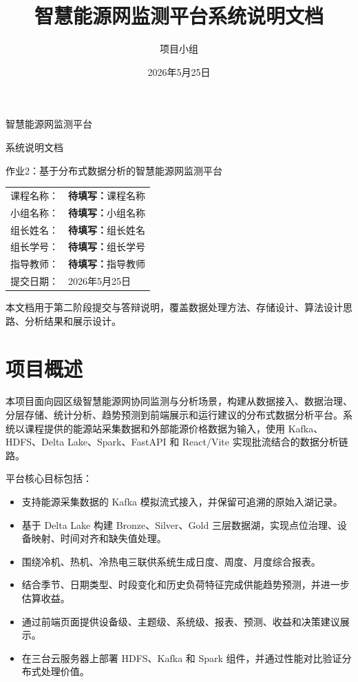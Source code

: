 \documentclass[UTF8,11pt,a4paper]{ctexart}
\title{智慧能源网监测平台系统说明文档}
\author{项目小组}
\date{2026年5月25日}
\newcommand{\todo}[1]{\textbf{待填写：}#1}
\begin{document}
\begin{titlepage}
  \centering
  \vspace*{2.2cm}
  {\heiti 智慧能源网监测平台\par}
  \vspace{0.6cm}
  {\heiti 系统说明文档\par}
  \vspace{1.4cm}
  {作业2：基于分布式数据分析的智慧能源网监测平台\par}
  \vspace{2.0cm}
  \begin{tabular}{rl}
    课程名称： & \todo{课程名称}\\[0.35cm]
    小组名称： & \todo{小组名称}\\[0.35cm]
    组长姓名： & \todo{组长姓名}\\[0.35cm]
    组长学号： & \todo{组长学号}\\[0.35cm]
    指导教师： & \todo{指导教师}\\[0.35cm]
    提交日期： & 2026年5月25日
  \end{tabular}
  \vfill
  {\small 本文档用于第二阶段提交与答辩说明，覆盖数据处理方法、存储设计、算法设计思路、分析结果和展示设计。}
\end{titlepage}

\tableofcontents
\newpage

\section{项目概述}

本项目面向园区级智慧能源网协同监测与分析场景，构建从数据接入、数据治理、分层存储、统计分析、趋势预测到前端展示和运行建议的分布式数据分析平台。系统以课程提供的能源站采集数据和外部能源价格数据为输入，使用 Kafka、HDFS、Delta Lake、Spark、FastAPI 和 React/Vite 实现批流结合的数据分析链路。

平台核心目标包括：

\begin{itemize}
  \item 支持能源采集数据的 Kafka 模拟流式接入，并保留可追溯的原始入湖记录。
  \item 基于 Delta Lake 构建 Bronze、Silver、Gold 三层数据湖，实现点位治理、设备映射、时间对齐和缺失值处理。
  \item 围绕冷机、热机、冷热电三联供系统生成日度、周度、月度综合报表。
  \item 结合季节、日期类型、时段变化和历史负荷特征完成供能趋势预测，并进一步估算收益。
  \item 通过前端页面提供设备级、主题级、系统级、报表、预测、收益和决策建议展示。
  \item 在三台云服务器上部署 HDFS、Kafka 和 Spark 组件，并通过性能对比验证分布式处理价值。
\end{itemize}
\end{document}
